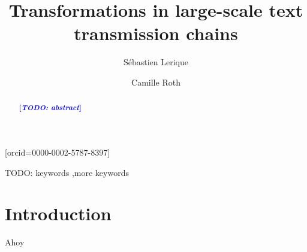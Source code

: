 \documentclass[a4paper,fleqn]{cas-dc}
\newcommand{\tb}[1]{\textcolor{blue}{#1}}
\newcommand{\rk}[1]{\tb{{\footnotesize {\bf[\emph{#1}]}}}}
\begin{document}
\def\textpagefraction{.001}

\title [mode = title]{Transformations in large-scale text transmission chains}

\author[1]{Sébastien Lerique}[orcid=0000-0002-5787-8397]
\cormark[1]
\address[1]{Embodied Cognitive Science Unit, Okinawa Institute of Science and Technology Graduate University, Onna-son, Okinawa 904-0495, Japan}

\author[2,3]{Camille Roth}
\address[2]{Camille's first affiliation}
\address[3]{Camille's second affiliation}


\begin{abstract}
  \rk{TODO: abstract}
\end{abstract}



\begin{keywords}
  TODO: keywords \sep more keywords
\end{keywords}


\maketitle

\section{Introduction}

Ahoy

\citet{lerique-2018-semantic-drift}

\printcredits

%



\end{document}
